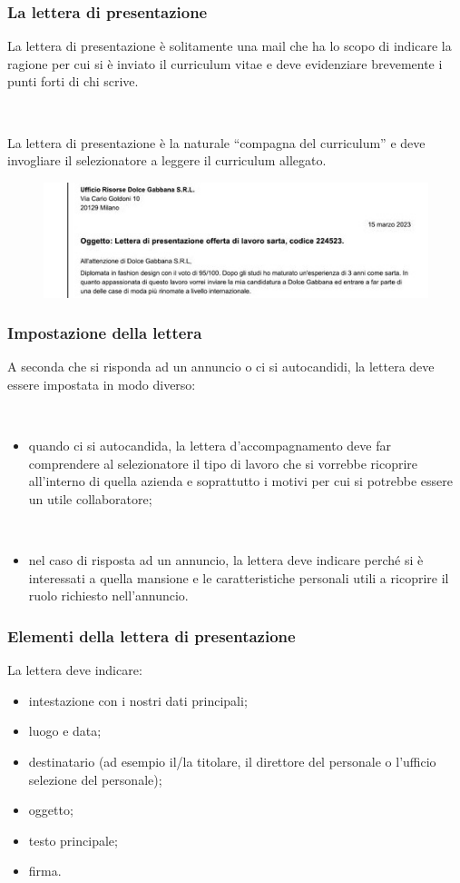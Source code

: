 \documentclass[handout]{beamer}
\begin{document}
\begin{frame}
\frametitle{La lettera di presentazione}
La lettera di presentazione è solitamente una mail che ha lo scopo di indicare la ragione per cui si è inviato il curriculum vitae e deve evidenziare brevemente i punti forti di chi scrive.\pause

~

La lettera di presentazione è la naturale ``compagna del curriculum'' e deve invogliare il selezionatore a leggere il curriculum allegato.

\begin{figure}
  \includegraphics[width=\columnwidth]{img/lettera.jpg}
\end{figure}
\end{frame}

\begin{frame}
\frametitle{Impostazione della lettera}
A seconda che si risponda ad un annuncio o ci si autocandidi, la lettera deve essere impostata in modo diverso:

~
\begin{itemize}
  \item quando ci si \alert{autocandida}, la lettera d'accompagnamento deve far comprendere al selezionatore il tipo di lavoro che si vorrebbe ricoprire all’interno di quella azienda e soprattutto i motivi per cui si potrebbe essere un utile collaboratore;\pause
  
  ~

  \item nel caso di risposta ad un \alert{annuncio}, la lettera deve indicare perché si è interessati a quella mansione e le caratteristiche personali utili a ricoprire il ruolo richiesto nell’annuncio.
\end{itemize}
\end{frame}
 

\begin{frame}
\frametitle{Elementi della lettera di presentazione}
La lettera deve indicare:
\begin{itemize}
  \item intestazione con i nostri dati principali;
  \item luogo e data;
  \item destinatario (ad esempio il/la titolare, il direttore del personale o l'ufficio selezione del personale);
  \item oggetto;
  \item testo principale;
  \item firma.
\end{itemize}
\end{frame}
\end{document}

